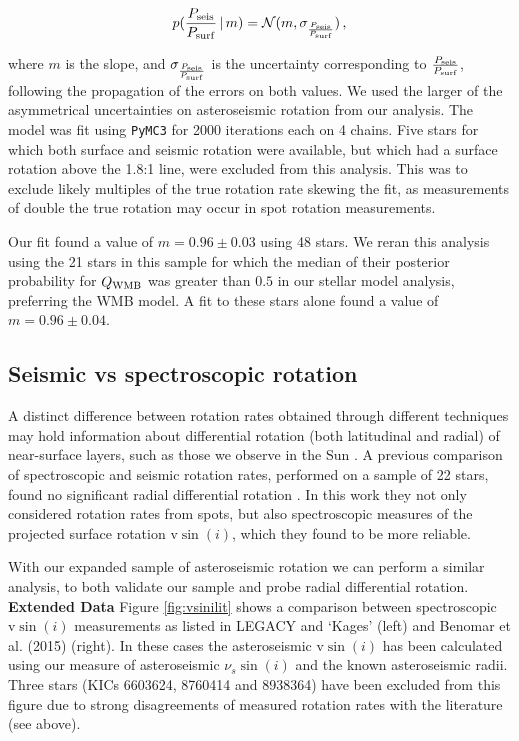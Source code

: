 \begin{equation}
	p(\frac{P_{\rm seis}}{P_{\rm surf}}\, |\, m) = \mathcal{N}(m, \sigma_\frac{P_{\rm seis}}{P_{\rm surf}})\, ,
\end{equation}

\noindent where $m$ is the slope, and $\sigma_\frac{P_{\rm seis}}{P_{\rm surf}}$ is the uncertainty corresponding to $\frac{P_{\rm seis}}{P_{\rm surf}}$, following the propagation of the errors on both values. We used the larger of the asymmetrical uncertainties on asteroseismic rotation from our analysis. The model was fit using \texttt{PyMC3} for 2000 iterations each on 4 chains. Five stars for which both surface and seismic rotation were available, but which had a surface rotation above the 1.8:1 line, were excluded from this analysis. This was to exclude likely multiples of the true rotation rate skewing the fit, as measurements of double the true rotation may occur in spot rotation measurements.

Our fit found a value of $m = 0.96 \pm 0.03$ using 48 stars. We reran this analysis using the 21 stars in this sample for which the median of their posterior probability for $Q_{\rm WMB}$ was greater than $0.5$ in our stellar model analysis, preferring the WMB model. A fit to these stars alone found a value of $m = 0.96 \pm 0.04$.

\subsection{Seismic vs spectroscopic rotation}
A distinct difference between rotation rates obtained through different techniques may hold information about differential rotation (both latitudinal and radial) of near-surface layers, such as those we observe in the Sun \cite{m_beck2000}.  A previous comparison of spectroscopic and seismic rotation rates, performed on a sample of 22 stars, found no significant radial differential rotation \cite{m_benomar+2018}. In this work they not only considered rotation rates from spots, but also spectroscopic measures of the projected surface rotation $\textrm{v}\sin(i)$, which they found to be more reliable.

With our expanded sample of asteroseismic rotation we can perform a similar analysis, to both validate our sample and probe radial differential rotation.  \textbf{Extended Data} Figure \ref{fig:vsinilit} shows a comparison between spectroscopic $\textrm{v}\sin(i)$ measurements as listed in LEGACY and `Kages' (left) and Benomar et al. (2015) \cite{m_benomar+2015} (right). In these cases the asteroseismic $\textrm{v}\sin(i)$ has been calculated using our measure of asteroseismic $\nu_s\sin(i)$ and the known asteroseismic radii. Three stars (KICs 6603624, 8760414 and 8938364) have been excluded from this figure due to strong disagreements of measured rotation rates with the literature (see above).

